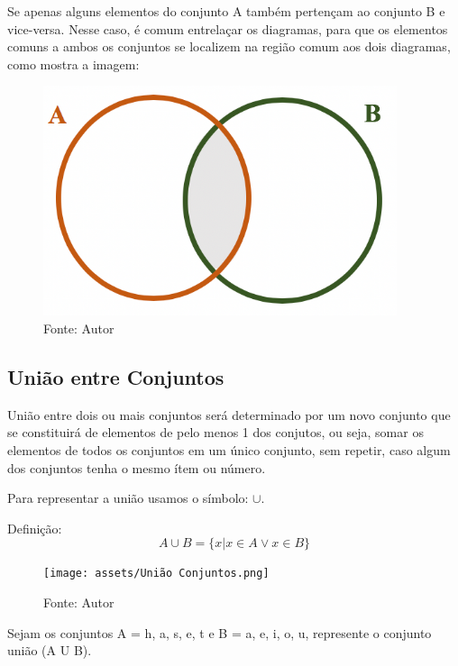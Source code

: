 \begin{multicols*}{2}
	Se apenas alguns elementos do conjunto A também pertençam ao conjunto B e vice-versa. Nesse caso, é comum entrelaçar os diagramas, para que os elementos comuns a ambos os conjuntos se localizem na região comum aos dois diagramas, como mostra a imagem:\\

	\begin{figure}[H]
		\centering
		\includegraphics[width=\columnwidth]{assets/Conjunto Intersecção.png}
		\caption*{Fonte: Autor}
	\end{figure}


	\subsection*{União entre Conjuntos}

	União entre dois ou mais conjuntos será determinado por um novo conjunto que se constituirá de elementos de pelo menos 1 dos conjutos, ou seja, somar os elementos de todos os conjuntos em um único conjunto, sem repetir, caso algum dos conjuntos tenha o mesmo ítem ou número.

	Para representar a união usamos o símbolo: $ \mathbf{ \cup } $.

	Definição:
	\[A\cup B=\{x|x\in A\lor x\in B\}\]

	\begin{figure}[H]
		\centering
		\texttt{[image: assets/União Conjuntos.png]}
		\caption*{Fonte: Autor}
	\end{figure}


	Sejam os conjuntos A = {h, a, s, e, t} e B = {a, e, i, o, u}, represente o conjunto união (A U B).


\end{multicols*}
